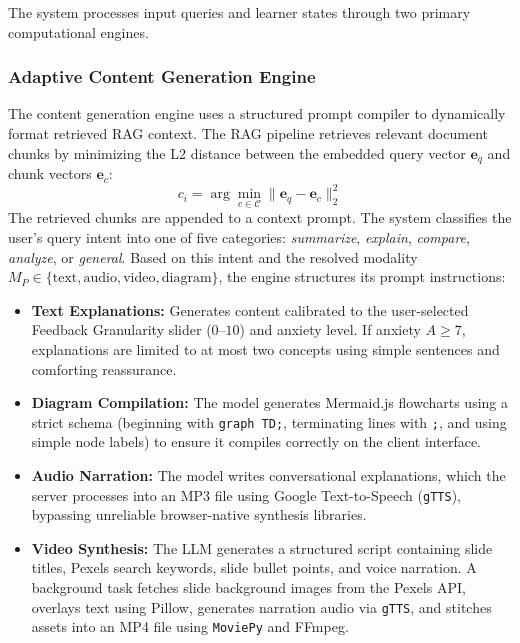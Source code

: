 The system processes input queries and learner states through two primary computational engines.

\subsubsection{Adaptive Content Generation Engine}
\label{subsubsec:content_generation_engine}

The content generation engine uses a structured prompt compiler to dynamically format retrieved RAG context. The RAG pipeline retrieves relevant document chunks by minimizing the L2 distance between the embedded query vector $\mathbf{e}_q$ and chunk vectors $\mathbf{e}_c$:
\begin{equation}
    c_i = \arg\min_{c \in \mathcal{C}} \|\mathbf{e}_q - \mathbf{e}_c\|_2^2
\end{equation}
The retrieved chunks are appended to a context prompt. The system classifies the user's query intent into one of five categories: \textit{summarize}, \textit{explain}, \textit{compare}, \textit{analyze}, or \textit{general}. Based on this intent and the resolved modality $M_P \in \{\text{text}, \text{audio}, \text{video}, \text{diagram}\}$, the engine structures its prompt instructions:
\begin{itemize}
    \item \textbf{Text Explanations:} Generates content calibrated to the user-selected Feedback Granularity slider ($0$--$10$) and anxiety level. If anxiety $A \ge 7$, explanations are limited to at most two concepts using simple sentences and comforting reassurance.
    \item \textbf{Diagram Compilation:} The model generates Mermaid.js flowcharts using a strict schema (beginning with \texttt{graph TD;}, terminating lines with \texttt{;}, and using simple node labels) to ensure it compiles correctly on the client interface.
    \item \textbf{Audio Narration:} The model writes conversational explanations, which the server processes into an MP3 file using Google Text-to-Speech (\texttt{gTTS}), bypassing unreliable browser-native synthesis libraries.
    \item \textbf{Video Synthesis:} The LLM generates a structured script containing slide titles, Pexels search keywords, slide bullet points, and voice narration. A background task fetches slide background images from the Pexels API, overlays text using Pillow, generates narration audio via \texttt{gTTS}, and stitches assets into an MP4 file using \texttt{MoviePy} and FFmpeg.
\end{itemize}

